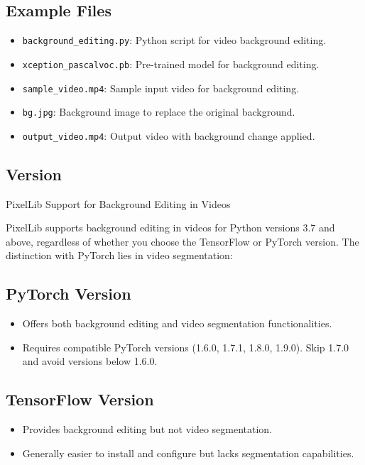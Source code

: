 \subsection{Example Files}
\begin{itemize}
    \item \texttt{background\_editing.py}: Python script for video background editing.
    \item \texttt{xception\_pascalvoc.pb}: Pre-trained model for background editing.
    \item \texttt{sample\_video.mp4}: Sample input video for background editing.
    \item \texttt{bg.jpg}: Background image to replace the original background.
    \item \texttt{output\_video.mp4}: Output video with background change applied.
\end{itemize}

\subsection{Version}
PixelLib Support for Background Editing in Videos

PixelLib supports background editing in videos for Python versions 3.7 and above, regardless of whether you choose the TensorFlow or PyTorch version. The distinction with PyTorch lies in video segmentation:

\subsection*{PyTorch Version}
\begin{itemize}[label=--]
    \item Offers both background editing and video segmentation functionalities.
    \item Requires compatible PyTorch versions (1.6.0, 1.7.1, 1.8.0, 1.9.0). Skip 1.7.0 and avoid versions below 1.6.0.
\end{itemize}

\subsection*{TensorFlow Version}
\begin{itemize}[label=--]
    \item Provides background editing but not video segmentation.
    \item Generally easier to install and configure but lacks segmentation capabilities.
\end{itemize}


